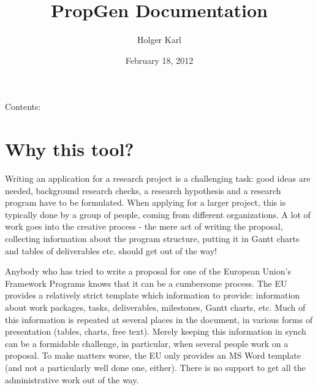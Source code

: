 \documentclass[a4paper,10pt,english]{sphinxmanual}
\title{PropGen Documentation}
\date{February 18, 2012}
\author{Holger Karl}
\begin{document}
\maketitle
\tableofcontents
{}\label{index::doc}


Contents:


\chapter{Why this tool?}
\label{motivation::doc}\label{motivation:welcome-to-propgen-s-documentation}\label{motivation:why-this-tool}
Writing an application for a research project is a challenging task: good ideas are needed, background research checks, a research hypothesis and a research program have to be formulated. When applying for a larger project, this is typically done by a group of people, coming from different organizations. A lot of work goes into the creative process - the mere act of writing the proposal, collecting information about the program structure, putting it in Gantt charts and tables of deliverables etc. should get out of the way!

Anybody who has tried to write a proposal for one of the European Union's Framework Programs knows that it can be a cumbersome process. The EU provides a relatively strict template which information to provide: information about work packages, tasks, deliverables, milestones, Gantt charts, etc. Much of this information is repeated at several places in the document, in various forms of presentation (tables, charts, free text). Merely keeping this information in synch can be a formidable challenge, in particular, when several people work on a proposal. To make matters worse, the EU only provides an MS Word template (and not a particularly well done one, either). There is no support to get all the administrative work out of the way.
\end{document}
